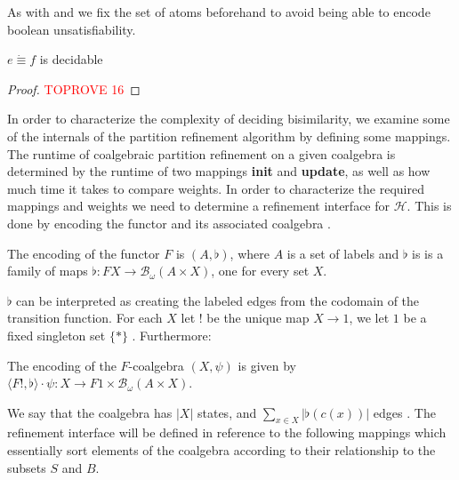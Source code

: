\documentclass[a4paper,UKenglish,cleveref, autoref, thm-restate]{lipics-v2021}
\newcommand{\gkat}{\textsf{\upshape{GKAT}}\xspace}
\newcommand{\probgkat}{\textsf{\upshape{ProbGKAT}}\xspace}
\theoremstyle{plain}\newtheoremrep{thm}{Theorem}[section]
\begin{document}
	\begin{toappendix} 
		\label{DecideAppendix}
		As with \gkat and \probgkat we fix the set of atoms beforehand to avoid being able to encode boolean unsatisfiability.
	\begin{thm}[Decidability]
		$e\dot\equiv f$ is decidable
	\end{thm}
	\begin{proof}\textcolor{red}{TOPROVE 16}\end{proof}

		In order to characterize the complexity of deciding bisimilarity, we examine some of the internals of the partition refinement algorithm by defining some mappings. The runtime of coalgebraic partition refinement on a given coalgebra is determined by the runtime of two mappings \textbf{init} and \textbf{update}, as well as how much time it takes to compare weights. In order to characterize the required mappings and weights we need to determine a refinement interface for $\mathcal{H}$. This is done by encoding the functor and its associated coalgebra \cite[Section 8]{wissmann2020efficient}. 
		
		\begin{defn}[\cite{10.1007/978-3-030-30942-8_18}]The encoding of the functor $F$ is $(A, \flat)$, where $A$ is a set of labels and $\flat$ is is a family of maps $\flat:FX \to \mathcal{B}_\omega (A \times X)$, one for every set $X$.
		\end{defn}
		$\flat$ can be interpreted as creating the labeled edges from the codomain of the transition function. 
		For each $X$ let $!$ be the unique map $X\to 1$, we let $1$ be a fixed singleton set $\{*\}$ \cite{10.1007/978-3-030-30942-8_18}. Furthermore:
		
		\begin{defn}[\cite{10.1007/978-3-030-30942-8_18}]The encoding of the $F$-coalgebra $(X, \psi)$ is given by $\langle F!,\flat\rangle\cdot \psi: X \to F1 \times \mathcal B_\omega(A \times X)$.
		\end{defn}
		
		We say that the coalgebra has $|X|$ states, and $\sum_{x\in X} |\flat(c(x))|$ edges \cite{10.1007/978-3-030-30942-8_18}. The refinement interface will be defined in reference to the following mappings which essentially sort elements of the coalgebra according to their relationship to the subsets $S$ and $B$. 
		

\end{toappendix}
\end{document}
